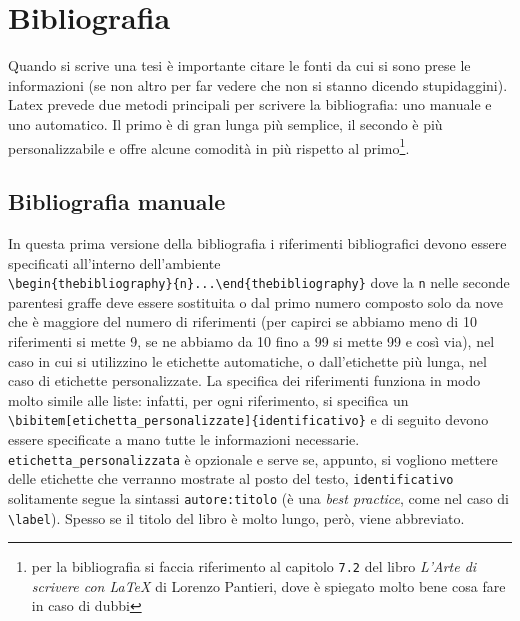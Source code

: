 \chapter{Bibliografia}
Quando si scrive una tesi è importante citare le fonti da cui si sono prese le 
informazioni (se non altro per far vedere che non si stanno dicendo 
stupidaggini). Latex prevede due metodi principali per scrivere la 
bibliografia: uno manuale e uno automatico. Il primo è di gran lunga più 
semplice, il secondo è più personalizzabile e offre alcune comodità in più 
rispetto al primo\footnote{per la bibliografia si faccia riferimento al 
capitolo \texttt{7.2} del libro \textit{L'Arte di scrivere con \LaTeX{}} di 
Lorenzo Pantieri, dove è spiegato molto bene cosa fare in caso di dubbi}.

\section{Bibliografia manuale} \label{sec:bibman}
In questa prima versione della bibliografia i riferimenti bibliografici devono 
essere specificati all'interno dell'ambiente \\
\verb!\begin{thebibliography}{n}...\end{thebibliography}! dove la \texttt{n} 
nelle seconde parentesi graffe deve essere sostituita o dal primo numero 
composto solo da nove che è maggiore del numero di riferimenti (per capirci se 
abbiamo meno di 10 riferimenti si mette 9, se ne abbiamo da 10 fino a 99 si 
mette 99 e così via), nel caso in cui si utilizzino le etichette automatiche, 
o dall'etichette più lunga, nel caso di etichette personalizzate. La specifica 
dei riferimenti funziona in modo molto simile alle liste: infatti, per ogni 
riferimento, si specifica un 
\verb!\bibitem[etichetta_personalizzate]{identificativo}! e di seguito devono 
essere specificate a mano tutte le informazioni necessarie. 
\verb!etichetta_personalizzata! è opzionale e serve se, appunto, si vogliono 
mettere delle etichette che verranno mostrate al posto del testo, 
\verb!identificativo! solitamente segue la sintassi \verb!autore:titolo! (è 
una \textit{best practice}, come nel caso di \verb!\label!). Spesso se il 
titolo del libro è molto lungo, però, viene abbreviato. 

